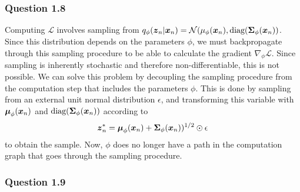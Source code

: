 \documentclass{article}
\begin{document}
\subsubsection*{Question 1.8}
Computing $\mathcal{L}$ involves sampling from $q_{\phi}(\boldsymbol{z}_n | \boldsymbol{x}_n) = \mathcal{N}(\mu_\phi(\boldsymbol{x}_n), \text{diag}(\boldsymbol{\Sigma}_\phi(\boldsymbol{x}_n))$. Since this distribution depends on the parameters $\phi$, we must backpropagate through this sampling procedure to be able to calculate the gradient $\nabla_{\phi}\mathcal{L}$. Since sampling is inherently stochastic and therefore non-differentiable, this is not possible. We can solve this problem by decoupling the sampling procedure from the computation step that includes the parameters $\phi$. This is done by sampling from an external unit normal distribution $\epsilon$, and transforming this variable with $\boldsymbol{\mu}_\phi(\boldsymbol{x}_n)$ and $\text{diag}(\boldsymbol{\Sigma}_\phi(\boldsymbol{x}_n))$ according to 
$$
\boldsymbol{z}_n^* = \boldsymbol{\mu}_\phi(\boldsymbol{x}_n) + \boldsymbol{\Sigma}_\phi(\boldsymbol{x}_n))^{1/2}  \odot \epsilon
$$ to obtain the sample. Now, $\phi$ does no longer have a path in the computation graph that goes through the sampling procedure.
\subsubsection*{Question 1.9}



\end{document}
